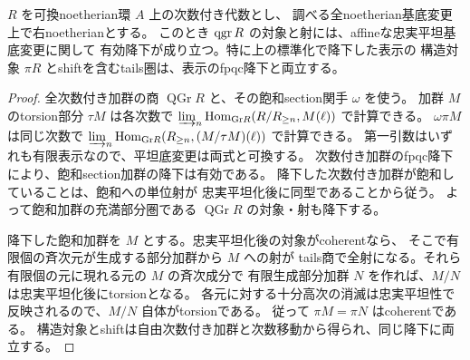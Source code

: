 \begin{proposition}\label{prop:h3-presented-qgr-fpqc}
$R$ を可換noetherian環 $A$ 上の次数付き代数とし、
調べる全noetherian基底変更上で右noetherianとする。
このとき $\operatorname{qgr} R$ の対象と射には、affineな忠実平坦基底変更に関して
有効降下が成り立つ。特に上の標準化で降下した表示の
構造対象 $\pi R$ とshiftを含むtails圏は、表示のfpqc降下と両立する。
\end{proposition}
\begin{proof}
全次数付き加群の商 $\operatorname{QGr}R$ と、その飽和section関手 $\omega$ を使う。
加群 $M$ のtorsion部分 $\tau M$ は各次数で
$\varinjlim_n\operatorname{Hom}_{\mathrm{Gr}R}(R/R_{\ge n},M(\ell))$ で計算できる。
$\omega\pi M$ は同じ次数で
$\varinjlim_n\operatorname{Hom}_{\mathrm{Gr}R}(R_{\ge n},(M/\tau M)(\ell))$
で計算できる。
第一引数はいずれも有限表示なので、平坦底変更は両式と可換する。
次数付き加群のfpqc降下により、飽和section加群の降下は有効である。
降下した次数付き加群が飽和していることは、飽和への単位射が
忠実平坦化後に同型であることから従う。
よって飽和加群の充満部分圏である $\operatorname{QGr}R$ の対象・射も降下する。

降下した飽和加群を $M$ とする。忠実平坦化後の対象がcoherentなら、
そこで有限個の斉次元が生成する部分加群から $M$ への射が
tails商で全射になる。それら有限個の元に現れる元の $M$ の斉次成分で
有限生成部分加群 $N$ を作れば、$M/N$ は忠実平坦化後にtorsionとなる。
各元に対する十分高次の消滅は忠実平坦性で反映されるので、$M/N$ 自体がtorsionである。
従って $\pi M=\pi N$ はcoherentである。
構造対象とshiftは自由次数付き加群と次数移動から得られ、同じ降下に両立する。
\end{proof}

